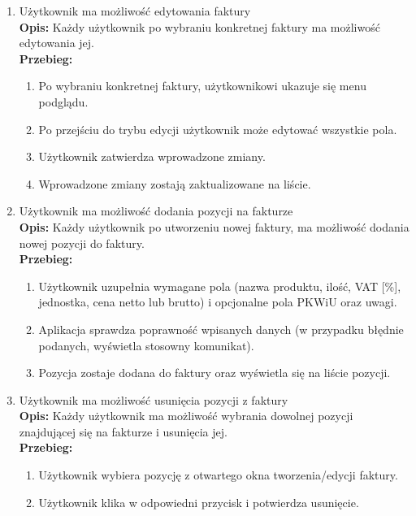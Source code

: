 \begin{enumerate}
    \item Użytkownik ma możliwość edytowania faktury\\
    \textbf{Opis: } Każdy użytkownik po wybraniu konkretnej faktury ma możliwość edytowania jej.\\
    \textbf{Przebieg: }
    \begin{enumerate}
        \item Po wybraniu konkretnej faktury, użytkownikowi ukazuje się menu podglądu.
        \item Po przejściu do trybu edycji użytkownik może edytować wszystkie pola.
        \item Użytkownik zatwierdza wprowadzone zmiany.
        \item Wprowadzone zmiany zostają zaktualizowane na liście.\\
    \end{enumerate}
    
        \item Użytkownik ma możliwość dodania pozycji na fakturze \\
    \textbf{Opis: } Każdy użytkownik po utworzeniu nowej faktury, ma możliwość dodania nowej pozycji do faktury.\\
    \textbf{Przebieg: }
    \begin{enumerate}
        \item Użytkownik uzupełnia wymagane pola (nazwa produktu, ilość, VAT [\%], jednostka, cena netto lub brutto) i opcjonalne pola PKWiU oraz uwagi.
        \item Aplikacja sprawdza poprawność wpisanych danych (w przypadku błędnie podanych, wyświetla stosowny komunikat).
        \item Pozycja zostaje dodana do faktury oraz wyświetla się na liście pozycji.
    \end{enumerate}
    
    \item Użytkownik ma możliwość usunięcia pozycji z faktury\\
    \textbf{Opis: } Każdy użytkownik ma możliwość wybrania dowolnej pozycji znajdującej się na fakturze i usunięcia jej.\\
    \textbf{Przebieg: } 
    \begin{enumerate}
        \item Użytkownik wybiera pozycję z otwartego okna tworzenia/edycji faktury. 
        \item Użytkownik klika w odpowiedni przycisk i potwierdza usunięcie. \\
    \end{enumerate}
    

\end{enumerate}
